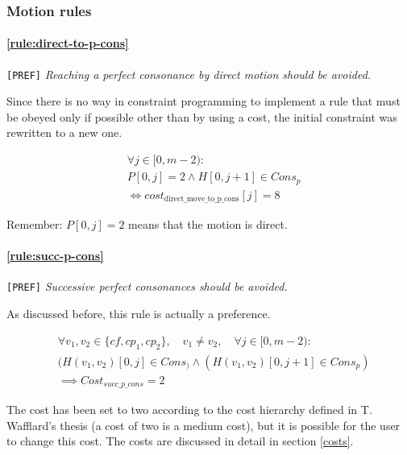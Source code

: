 \subsubsection{Motion rules}
\paragraph{\hspace{.6cm}\ref{rule:direct-to-p-cons}} \greendots \texttt{[PREF]} \textit{Reaching a perfect consonance by direct motion should be avoided.}

    Since there is no way in constraint programming to implement a rule that must be obeyed only if possible other than by using a cost, the initial constraint was rewritten to a new one.

    \begin{equation} \begin{aligned}
    &\forall j \in [0, m-2) :\\
    &P[0, j] = 2 \land H[0, j+1] \in Cons_{p} \\
    &\iff cost_{\text{{direct\_move\_to\_p\_cons}}}[j] = 8
    \end{aligned} \end{equation}

    Remember: $P[0,j] = 2$ means that the motion is direct.
    
\paragraph{\hspace{.6cm}\ref{rule:succ-p-cons}} \texttt{[PREF]} \textit{Successive perfect consonances should be avoided.}

    As discussed before, this rule is actually a preference.

    \begin{equation} \begin{aligned}
    &\forall v_1, v_2 \in \{cf, cp_1, cp_2\}, \quad v_1 \neq v_2, \quad \forall j \in [0, m-2) \colon\\
    &(H(v_1,v_2)[0, j] \in Cons_) \land (H(v_1,v_2)[0, j+1] \in Cons_p)\\
    &\implies Cost_{succ\_p\_cons} = 2
    \end{aligned} \end{equation}

    The cost has been set to two according to the cost hierarchy defined in T. Wafflard's thesis (a cost of two is a medium cost), but it is possible for the user to change this cost. The costs are discussed in detail in section \ref{costs}.
    
